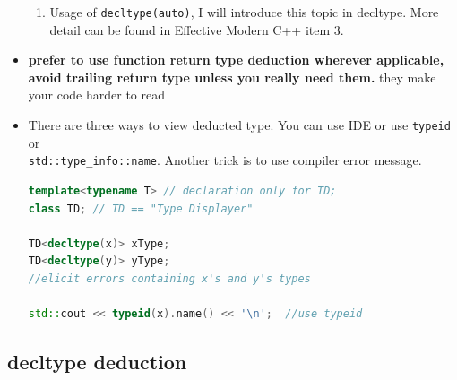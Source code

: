 \documentclass[a4paper,11pt,twoside]{book}
\begin{document}
\begin{itemize}
\begin{enumerate}
		\item Usage of \texttt{decltype(auto)}, I will introduce this topic in decltype. More detail can be found in Effective Modern C++ item 3.
	\end{enumerate}
	
	\item \textbf{prefer to use function return type deduction wherever applicable, avoid trailing return type unless you really need them.} they make your code harder to read
	
	\item There are three ways to view deducted type. You can use IDE or use \texttt{typeid} or \\ \texttt{std::type\_info::name}. Another trick is to use compiler error message.

\begin{lstlisting}[frame=single, language=c++]
template<typename T> // declaration only for TD;
class TD; // TD == "Type Displayer"

TD<decltype(x)> xType; 
TD<decltype(y)> yType; 
//elicit errors containing x's and y's types

std::cout << typeid(x).name() << '\n';  //use typeid 
\end{lstlisting}
		
\end{itemize}



\subsection{decltype deduction}
\end{document}
